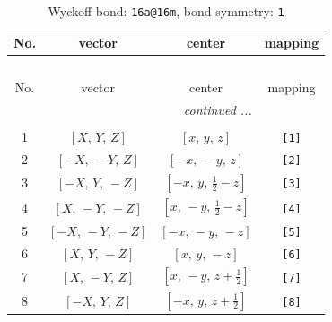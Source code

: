 \documentclass[fleqn,8pt]{jsarticle}
\begin{document}
\begin{longtable}{cccc}
\caption{Wyckoff bond: {\tt 16a@16m}, bond symmetry: {\tt 1}}
 \\
 \hline \hline
No. & vector & center & mapping \\ \hline \endfirsthead

\multicolumn{3}{l}{\tablename\ \thetable{}} \\
 \hline \hline
No. & vector & center & mapping \\ \hline \endhead

 \hline \hline
\multicolumn{3}{r}{\footnotesize\it continued ...} \\ \endfoot

 \hline \hline
\multicolumn{3}{r}{} \\ \endlastfoot

1 & $\left[ X,\, Y,\, Z \right]$ & $\left[ x,\, y,\, z \right]$ & {\tt [1]} \\ \hline
2 & $\left[ - X,\, - Y,\, Z \right]$ & $\left[ - x,\, - y,\, z \right]$ & {\tt [2]} \\ \hline
3 & $\left[ - X,\, Y,\, - Z \right]$ & $\left[ - x,\, y,\, \frac{1}{2} - z \right]$ & {\tt [3]} \\ \hline
4 & $\left[ X,\, - Y,\, - Z \right]$ & $\left[ x,\, - y,\, \frac{1}{2} - z \right]$ & {\tt [4]} \\ \hline
5 & $\left[ - X,\, - Y,\, - Z \right]$ & $\left[ - x,\, - y,\, - z \right]$ & {\tt [5]} \\ \hline
6 & $\left[ X,\, Y,\, - Z \right]$ & $\left[ x,\, y,\, - z \right]$ & {\tt [6]} \\ \hline
7 & $\left[ X,\, - Y,\, Z \right]$ & $\left[ x,\, - y,\, z + \frac{1}{2} \right]$ & {\tt [7]} \\ \hline
8 & $\left[ - X,\, Y,\, Z \right]$ & $\left[ - x,\, y,\, z + \frac{1}{2} \right]$ & {\tt [8]} \\
\end{longtable}
\end{document}
